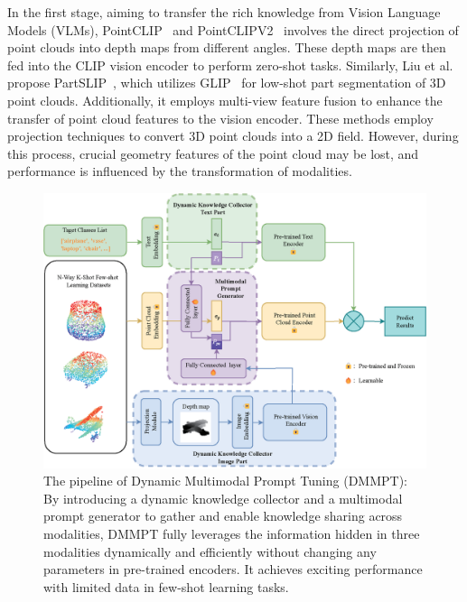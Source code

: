 \documentclass{ecai}
\begin{document}
In the first stage, aiming to transfer the rich knowledge from Vision Language Models (VLMs), PointCLIP~\cite{zhang2022pointclip} and PointCLIPV2~\cite{zhu2023pointclip} involves the direct projection of point clouds into depth maps from different angles. These depth maps are then fed into the CLIP vision encoder to perform zero-shot tasks. Similarly, Liu et al. propose PartSLIP~\cite{liu2023partslip}, which utilizes GLIP~\cite{li2022grounded} for low-shot part segmentation of 3D point clouds. Additionally, it employs multi-view feature fusion to enhance the transfer of point cloud features to the vision encoder. These methods employ projection techniques to convert 3D point clouds into a 2D field. However, during this process, crucial geometry features of the point cloud may be lost, and performance is influenced by the transformation of modalities.

\begin{figure}[th]
\centerline{\includegraphics[width=0.95\linewidth]{pipeline.eps}}
\caption{The pipeline of Dynamic Multimodal Prompt Tuning (DMMPT): By introducing a dynamic knowledge collector and a multimodal prompt generator to gather and enable knowledge sharing across modalities, DMMPT fully leverages the information hidden in three modalities dynamically and efficiently without changing any parameters in pre-trained encoders. It achieves exciting performance with limited data in few-shot learning tasks.     } \label{pipeline}
\vspace{4pt}
\end{figure}
     
\end{document}
